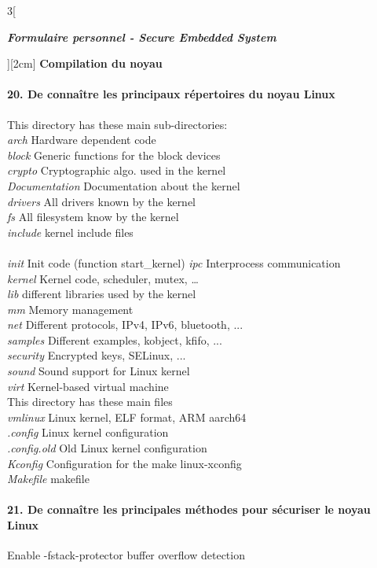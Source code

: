 \begin{multicols}{3}[\centerline{ \large\em \textbf{Formulaire personnel - Secure Embedded System}}][2cm]
{\Large \textbf{Compilation du noyau}}\\
\paragraph*{20. De connaître les principaux répertoires du noyau Linux\\}
This directory has these main sub-directories:\\
\textit{arch} Hardware dependent code\\
\textit{block} Generic functions for the block devices\\
\textit{crypto} Cryptographic algo. used in the kernel\\
\textit{Documentation} Documentation about the kernel\\
\textit{drivers} All drivers known by the kernel\\
\textit{fs} All filesystem know by the kernel\\
\textit{include} kernel include files\\\\
\textit{init} Init code (function start\_kernel)
\textit{ipc} Interprocess communication\\
\textit{kernel} Kernel code, scheduler, mutex, …\\
\textit{lib} different libraries used by the kernel\\
\textit{mm} Memory management\\
\textit{net} Different protocols, IPv4, IPv6, bluetooth, ...\\
\textit{samples} Different examples, kobject, kfifo, ...\\
\textit{security} Encrypted keys, SELinux, ...\\
\textit{sound} Sound support for Linux kernel\\
\textit{virt} Kernel-based virtual machine\\
This directory has these main files\\
\textit{vmlinux} Linux kernel, ELF format, ARM aarch64\\
\textit{.config} Linux kernel configuration\\
\textit{.config.old} Old Linux kernel configuration\\
\textit{Kconfig} Configuration for the make linux-xconfig\\
\textit{Makefile} makefile\\
\paragraph*{21. De connaître les principales méthodes pour sécuriser le noyau Linux\\}
Enable -fstack-protector buffer overflow detection \\

\end{multicols}
